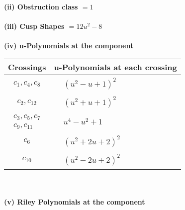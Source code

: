 \documentclass[1p]{elsarticle_modified}
\theoremstyle{definition}
\begin{document}
\flushleft \textbf{(ii) Obstruction class $= 1$}\\~\\
\flushleft \textbf{(iii) Cusp Shapes $= 12 u^2-8$}\\~\\
\newpage\renewcommand{\arraystretch}{1}
\flushleft \textbf{(iv) u-Polynomials at the component}\newline \\
\begin{tabular}{m{50pt}|m{274pt}}
Crossings & \hspace{64pt}u-Polynomials at each crossing \\
\hline $$\begin{aligned}c_{1},c_{4},c_{8}\end{aligned}$$&$\begin{aligned}
&(u^2- u+1)^2
\end{aligned}$\\
\hline $$\begin{aligned}c_{2},c_{12}\end{aligned}$$&$\begin{aligned}
&(u^2+u+1)^2
\end{aligned}$\\
\hline $$\begin{aligned}c_{3},c_{5},c_{7}\\c_{9},c_{11}\end{aligned}$$&$\begin{aligned}
&u^4- u^2+1
\end{aligned}$\\
\hline $$\begin{aligned}c_{6}\end{aligned}$$&$\begin{aligned}
&(u^2+2 u+2)^2
\end{aligned}$\\
\hline $$\begin{aligned}c_{10}\end{aligned}$$&$\begin{aligned}
&(u^2-2 u+2)^2
\end{aligned}$\\
\hline
\end{tabular}\\~\\
\newpage\renewcommand{\arraystretch}{1}
\flushleft \textbf{(v) Riley Polynomials at the component}\newline \\
\end{document}
